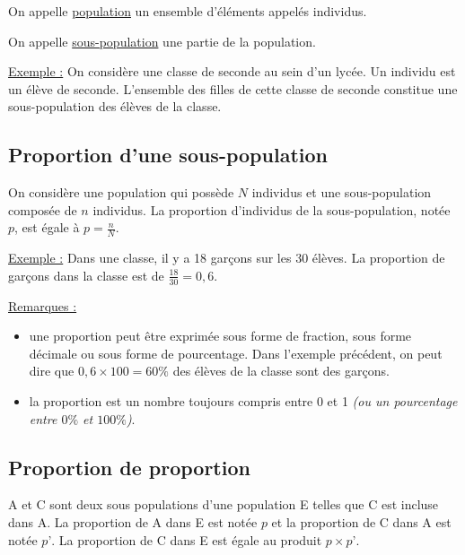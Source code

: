 \documentclass[french]{book}
\begin{document}
\begin{defn}
On appelle \underline{population} un ensemble d’éléments appelés individus.

On appelle \underline{sous-population} une partie de la population.
\end{defn}

\underline{Exemple :}  On considère une classe de seconde au sein d’un lycée. Un individu est un élève de seconde. L’ensemble des filles de cette classe de seconde constitue une sous-population des élèves de la classe.

   \subsection{Proportion d’une sous-population}

\begin{defn}
On considère une population qui possède $N$ individus et une sous-population composée de $n$ individus. La proportion d’individus de la sous-population, notée $p$, est égale à $p=\frac{n}{N}$.
\end{defn}

\underline{Exemple :}
Dans une classe, il y a 18 garçons sur les 30 élèves. La proportion de garçons dans la classe est de $\frac{18}{30}=0,6$.

\underline{Remarques :}

\begin{itemize}

\item[$\bullet$] une proportion peut être exprimée sous forme de fraction, sous forme décimale ou sous forme de pourcentage. Dans l’exemple précédent, on peut dire que $0,6 \times 100 = 60\%$ des élèves de la classe sont des garçons.

\item[$\bullet$] la proportion est un nombre toujours compris entre 0 et 1 \emph{(ou un pourcentage entre $0\%$ et $100\%$)}.
\end{itemize}

   \subsection{Proportion de proportion}

\begin{prop}
A et C sont deux sous populations d’une population E telles que C est incluse dans A. La proportion de A dans E est notée $p$ et la proportion de C dans A est notée $p’$. La proportion de C dans E est égale au produit $p\times p’$.
\end{prop}\\
\end{document}
